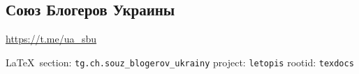  
 
\subsection{Союз Блогеров Украины}
\label{sec:tg.ch.souz_blogerov_ukrainy}
\url{https://t.me/ua_sbu}
  
\vspace{0.5cm}
 {\ifDEBUG\small\LaTeX~section: \verb|tg.ch.souz_blogerov_ukrainy| project: \verb|letopis| rootid: \verb|texdocs|	\fi}
\vspace{0.5cm}

  
